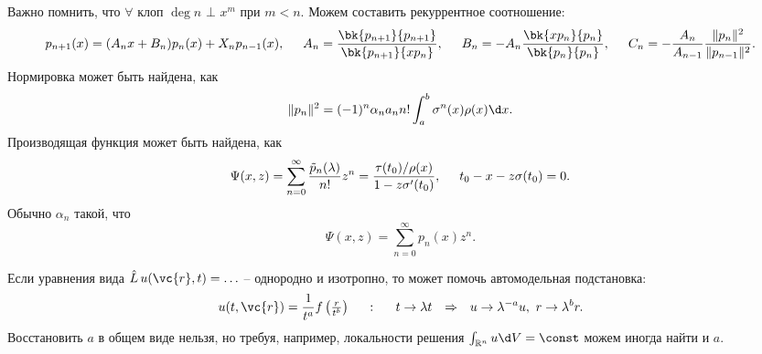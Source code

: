 Важно помнить, что $\forall$ клоп $\deg n$ $\bot$ $x^m$ при $m < n$. Можем составить рекуррентное соотношение:
\begin{equation*}
    p_{n+1} (x) = (A_n x + B_n) p_n (x) + X_n p_{n-1} (x),
    \hspace{5 mm} 
    A_n = \frac{
        \bk{p_{n+1}}{p_{n+1}}
    }{
        \bk{p_{n+1}}{x p_n}
    },
    \hspace{5 mm} 
    B_n = -A_n \frac{\bk{x p_n}{p_n}}{\bk{p_n}{p_n}},
    \hspace{5 mm} 
    C_n = - \frac{A_n}{A_{n-1}} \frac{\|p_n\|^2}{\|p_{n-1}\|^2}.
\end{equation*}
Нормировка может быть найдена, как
\begin{equation*}
    \|p_n\|^2 = (-1)^n \alpha_n a_n n! \int_{a}^{b} \sigma^n (x) \rho(x) \d x.
\end{equation*}
Производящая функция может быть найдена, как
\begin{equation*}
    \Psi(x, z) = \sum_{n=0}^{\infty}  \frac{\tilde{p}_n (\lambda)}{n!} z^n = 
    \frac{\tau(t_0)/ \rho(x)}{1 - z \sigma' (t_0)},
    \hspace{5 mm} 
    t_0 - x -  z \sigma(t_0) = 0.
\end{equation*}
Обычно $\alpha_n$ такой, что
\begin{equation*}
    \Psi(x, z) = \sum_{n=0}^{\infty} p_n (x) z^n.
\end{equation*}


Если уравнения вида $\hat{L}\, u(\vc{r}, t) = \ldots$ -- однородно и изотропно, то может помочь автомодельная подстановка:
\begin{equation}
	u(t, \vc{r}) = \frac{1}{t^a} f\left(\tfrac{r}{t^b}\right)
	\hspace{5 mm} \colon \hspace{5 mm} 
	t \to \lambda t
	\hspace{0.25cm} \Rightarrow \hspace{0.25cm}
	u \to \lambda^{-a} u, \ r \to \lambda^{b} r.
	\label{am}
\end{equation}
Восстановить $a$ в общем виде нельзя, но требуя, например, локальности решения $\int_{\mathbb{R}^n} u \d V = \const$ можем иногда найти и $a$. 





